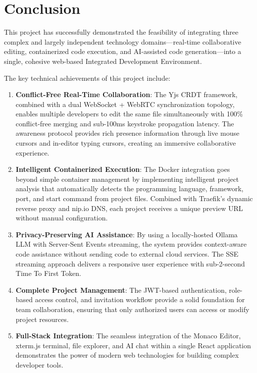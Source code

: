 \documentclass[12pt,a4paper,oneside]{report}
\begin{document}
\chapter{Conclusion}

This project has successfully demonstrated the feasibility of integrating three complex and largely independent technology domains---real-time collaborative editing, containerized code execution, and AI-assisted code generation---into a single, cohesive web-based Integrated Development Environment.

The key technical achievements of this project include:

\begin{enumerate}[label=\arabic*.]
    \item \textbf{Conflict-Free Real-Time Collaboration}: The Yjs CRDT framework, combined with a dual WebSocket + WebRTC synchronization topology, enables multiple developers to edit the same file simultaneously with 100\% conflict-free merging and sub-100ms keystroke propagation latency. The awareness protocol provides rich presence information through live mouse cursors and in-editor typing cursors, creating an immersive collaborative experience.

    \item \textbf{Intelligent Containerized Execution}: The Docker integration goes beyond simple container management by implementing intelligent project analysis that automatically detects the programming language, framework, port, and start command from project files. Combined with Traefik's dynamic reverse proxy and nip.io DNS, each project receives a unique preview URL without manual configuration.

    \item \textbf{Privacy-Preserving AI Assistance}: By using a locally-hosted Ollama LLM with Server-Sent Events streaming, the system provides context-aware code assistance without sending code to external cloud services. The SSE streaming approach delivers a responsive user experience with sub-2-second Time To First Token.

    \item \textbf{Complete Project Management}: The JWT-based authentication, role-based access control, and invitation workflow provide a solid foundation for team collaboration, ensuring that only authorized users can access or modify project resources.

    \item \textbf{Full-Stack Integration}: The seamless integration of the Monaco Editor, xterm.js terminal, file explorer, and AI chat within a single React application demonstrates the power of modern web technologies for building complex developer tools.
\end{enumerate}
\end{document}
